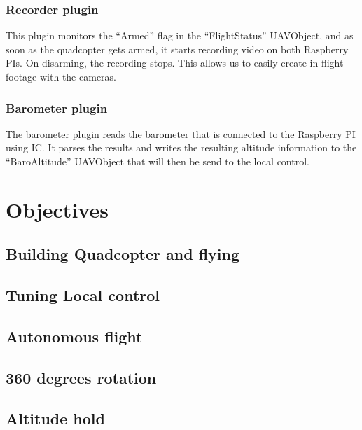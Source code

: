 \documentclass[11pt, a4paper, onecolumn, oneside, parskip=half]{scrartcl}
\begin{document}
\subsubsection{Recorder plugin}
\label{sec:software:global:recorder}
This plugin monitors the ``Armed'' flag in the ``FlightStatus'' UAVObject, and as soon as the quadcopter gets armed, it starts recording video on both Raspberry PIs. On disarming, the recording stops. This allows us to easily create in-flight footage with the cameras.

\subsubsection{Barometer plugin}
\label{sec:software:global:barometer}
The barometer plugin reads the barometer that is connected to the Raspberry PI using I\texttwosuperior C. It parses the results and writes the resulting altitude information to the ``BaroAltitude'' UAVObject that will then be send to the local control.

\section{Objectives}
\label{sec:objectives}

\subsection{Building Quadcopter and flying}
\label{sec:objectives:building}

\subsection{Tuning Local control}
\label{sec:objectives:tuning}

\subsection{Autonomous flight}
\label{sec:objectives:autonomous}

\subsection{360 degrees rotation}
\label{sec:objectives:panorama}

\subsection{Altitude hold}
\label{sec:objectives:altitude}
\end{document}
